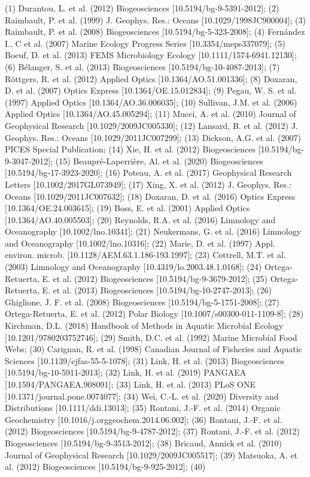 \begingroup\fontsize{4}{6}\selectfont

\begin{ThreePartTable}
\begin{TableNotes}
\item (1) Durantou, L. et al. (2012) Biogeosciences [10.5194/bg-9-5391-2012]; (2) Raimbault, P. et al. (1999) J. Geophys. Res.: Oceans [10.1029/1998JC900004]; (3) Raimbault, P. et al. (2008) Biogeosciences [10.5194/bg-5-323-2008]; (4) Fernández I., C et al. (2007) Marine Ecology Progress Series [10.3354/meps337079]; (5) Boeuf, D. et al. (2013) FEMS Microbiology Ecology [10.1111/1574-6941.12130]; (6) Bélanger, S. et al. (2013) Biogeosciences [10.5194/bg-10-4087-2013]; (7) Röttgers, R. et al. (2012) Applied Optics [10.1364/AO.51.001336]; (8) Doxaran, D. et al. (2007) Optics Express [10.1364/OE.15.012834]; (9) Pegau, W. S. et al. (1997) Applied Optics [10.1364/AO.36.006035]; (10) Sullivan, J.M. et al. (2006) Applied Optics [10.1364/AO.45.005294]; (11) Mucci, A. et al. (2010) Journal of Geophysical Research [10.1029/2009JC005330]; (12) Lansard, B. et al. (2012) J. Geophys. Res.: Oceans [10.1029/2011JC007299]; (13) Dickson, A.G. et al. (2007) PICES Special Publication; (14) Xie, H. et al. (2012) Biogeosciences [10.5194/bg-9-3047-2012]; (15) Beaupré-Laperrière, Al. et al. (2020) Biogeosciences [10.5194/bg-17-3923-2020]; (16) Poteau, A. et al. (2017) Geophysical Research Letters [10.1002/2017GL073949]; (17) Xing, X. et al. (2012) J. Geophys. Res.: Oceans [10.1029/2011JC007632]; (18) Doxaran, D. et al. (2016) Optics Express [10.1364/OE.24.003615]; (19) Boss, E. et al. (2001) Applied Optics [10.1364/AO.40.005503]; (20) Reynolds, R.A. et al. (2016) Limnology and Oceanography [10.1002/lno.10341]; (21) Neukermans, G. et al. (2016) Limnology and Oceanography [10.1002/lno.10316]; (22) Marie, D. et al. (1997) Appl. environ. microb. [10.1128/AEM.63.1.186-193.1997]; (23) Cottrell, M.T. et al. (2003) Limnology and Oceanography [10.4319/lo.2003.48.1.0168]; (24) Ortega-Retuerta, E. et al. (2012) Biogeosciences [10.5194/bg-9-3679-2012]; (25) Ortega-Retuerta, E. et al. (2013) Biogeosciences [10.5194/bg-10-2747-2013]; (26) Ghiglione, J. F. et al. (2008) Biogeosciences [10.5194/bg-5-1751-2008]; (27) Ortega-Retuerta, E. et al. (2012) Polar Biology [10.1007/s00300-011-1109-8]; (28) Kirchman, D.L. (2018) Handbook of Methods in Aquatic Microbial Ecology [10.1201/9780203752746]; (29) Smith, D.C. et al. (1992) Marine Microbial Food Webs; (30) Carignan, R. et al. (1998) Canadian Journal of Fisheries and Aquatic Sciences [10.1139/cjfas-55-5-1078]; (31) Link, H. et al. (2013) Biogeosciences [10.5194/bg-10-5911-2013]; (32) Link, H. et al. (2019) PANGAEA [10.1594/PANGAEA.908091]; (33) Link, H. et al. (2013) PLoS ONE [10.1371/journal.pone.0074077]; (34) Wei, C.‐L. et al. (2020) Diversity and Distributions [10.1111/ddi.13013]; (35) Rontani, J.-F. et al. (2014) Organic Geochemistry [10.1016/j.orggeochem.2014.06.002]; (36) Rontani, J.-F. et al. (2012) Biogeosciences [10.5194/bg-9-4787-2012]; (37) Rontani, J.-F. et al. (2012) Biogeosciences [10.5194/bg-9-3513-2012]; (38) Bricaud, Annick et al. (2010) Journal of Geophysical Research [10.1029/2009JC005517]; (39) Matsuoka, A. et al. (2012) Biogeosciences [10.5194/bg-9-925-2012]; (40) 
\end{TableNotes}
\end{ThreePartTable}
